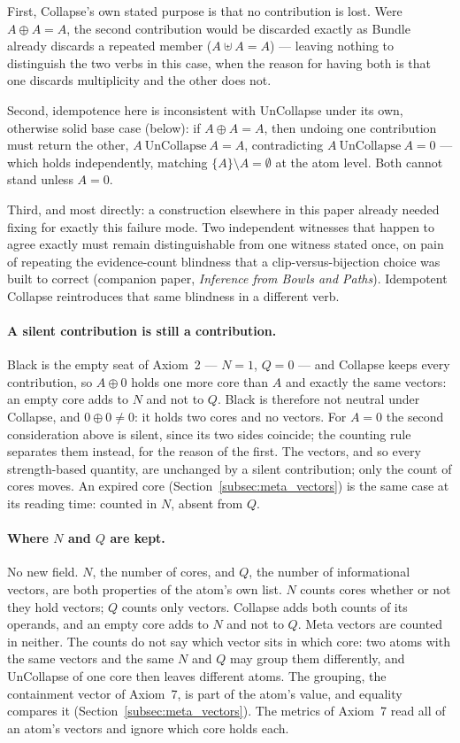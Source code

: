 \documentclass[12pt, a4paper]{article}
\begin{document}
First, Collapse's own stated purpose is that no contribution is lost.
Were $A\oplus A=A$, the second contribution would be discarded
exactly as Bundle already discards a repeated member
($A\uplus A=A$) --- leaving nothing to distinguish the two verbs in
this case, when the reason for having both is that one discards
multiplicity and the other does not.

Second, idempotence here is inconsistent with UnCollapse under its
own, otherwise solid base case (below): if $A\oplus A=A$, then
undoing one contribution must return the other, $A\ \text{UnCollapse}\ A=A$,
contradicting $A\ \text{UnCollapse}\ A=0$ --- which holds independently, matching
$\{A\}\setminus A=\emptyset$ at the atom level. Both cannot stand
unless $A=0$.

Third, and most directly: a construction elsewhere in this paper
already needed fixing for exactly this failure mode. Two independent
witnesses that happen to agree exactly must remain distinguishable
from one witness stated once, on pain of repeating the
evidence-count blindness that a clip-versus-bijection choice was
built to correct (companion paper, \emph{Inference from Bowls and
Paths}). Idempotent Collapse reintroduces that same blindness in a
different verb.

\paragraph{A silent contribution is still a contribution.} Black is
the empty seat of Axiom~2 --- $N=1$, $Q=0$ --- and Collapse keeps every
contribution, so $A\oplus 0$ holds one more core than $A$ and exactly
the same vectors: an empty core adds to $N$ and not to $Q$. Black is
therefore not neutral under Collapse, and $0\oplus 0\ne 0$: it holds
two cores and no vectors. For $A=0$ the second consideration above is
silent, since its two sides coincide; the counting rule separates them
instead, for the reason of the first. The vectors, and so every
strength-based quantity, are unchanged by a silent contribution; only
the count of cores moves. An expired core
(Section~\ref{subsec:meta_vectors}) is the same case at its reading
time: counted in $N$, absent from $Q$.

\paragraph{Where $N$ and $Q$ are kept.} No new field. $N$, the number
of cores, and $Q$, the number of informational vectors, are both properties of the atom's own list. $N$ counts cores whether or not they hold vectors; $Q$ counts only vectors. Collapse adds both counts of its operands, and an empty core adds to $N$ and not to $Q$. Meta vectors are counted in neither. The counts do not say which vector sits in which core: two atoms with the same vectors and the same $N$ and $Q$ may group them differently, and UnCollapse of one core then leaves different atoms. The grouping, the containment vector of Axiom~7, is part of the atom's value, and equality compares it (Section~\ref{subsec:meta_vectors}). The metrics of Axiom~7 read all of an atom's vectors and ignore which core holds each.
\end{document}
